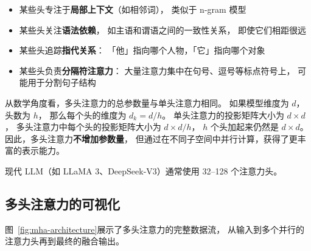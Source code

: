 \begin{itemize}[noitemsep]
  \item 某些头专注于\textbf{局部上下文}（如相邻词），
        类似于 n-gram 模型
  \item 某些头关注\textbf{语法依赖}，
        如主语和谓语之间的一致性关系，
        即使它们相距很远
  \item 某些头追踪\textbf{指代关系}：
        「他」指向哪个人物，「它」指向哪个对象
  \item 某些头负责\textbf{分隔符注意力}：
        大量注意力集中在句号、逗号等标点符号上，
        可能用于分割句子结构
\end{itemize}

从数学角度看，多头注意力的总参数量与单头注意力相同。
如果模型维度为 $d$，头数为 $h$，
那么每个头的维度为 $d_k = d/h$。
单头注意力的投影矩阵大小为 $d \times d$，
多头注意力中每个头的投影矩阵大小为 $d \times d/h$，
$h$ 个头加起来仍然是 $d \times d$。
因此，多头注意力\textbf{不增加参数量}，
但通过在不同子空间中并行计算，获得了更丰富的表示能力。

现代 LLM（如 LLaMA 3、DeepSeek-V3）通常使用 32--128 个注意力头。

\subsection{多头注意力的可视化}

图~\ref{fig:mha-architecture}展示了多头注意力的完整数据流，
从输入到多个并行的注意力头再到最终的融合输出。

